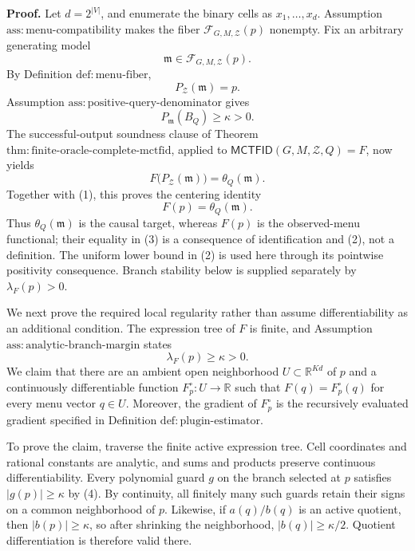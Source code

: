 \textbf{Proof.}
Let \(d=2^{|V|}\), and enumerate the binary cells as \(x_1,\ldots,x_d\).  Assumption \(\mathrm{ass:menu\text{-}compatibility}\) makes the fiber \(\mathcal F_{G,M,\mathcal Z}(p)\) nonempty.  Fix an arbitrary generating model
\[
 \mathfrak m\in\mathcal F_{G,M,\mathcal Z}(p).
\]
By Definition \(\mathrm{def:menu\text{-}fiber}\),
\[
 P_{\mathcal Z}(\mathfrak m)=p. \tag{1}
\]
Assumption \(\mathrm{ass:positive\text{-}query\text{-}denominator}\) gives
\[
 P_{\mathfrak m}(B_Q)\geq\kappa>0. \tag{2}
\]
The successful-output soundness clause of Theorem \(\mathrm{thm:finite\text{-}oracle\text{-}complete\text{-}mctfid}\), applied to \(\mathsf{MCTFID}(G,M,\mathcal Z,Q)=F\), now yields
\[
 F\bigl(P_{\mathcal Z}(\mathfrak m)\bigr)=\theta_Q(\mathfrak m).
\]
Together with (1), this proves the centering identity
\[
 F(p)=\theta_Q(\mathfrak m). \tag{3}
\]
Thus \(\theta_Q(\mathfrak m)\) is the causal target, whereas \(F(p)\) is the observed-menu functional; their equality in (3) is a consequence of identification and (2), not a definition.  The uniform lower bound in (2) is used here through its pointwise positivity consequence.  Branch stability below is supplied separately by \(\lambda_F(p)>0\).

We next prove the required local regularity rather than assume differentiability as an additional condition.  The expression tree of \(F\) is finite, and Assumption \(\mathrm{ass:analytic\text{-}branch\text{-}margin}\) states
\[
 \lambda_F(p)\geq\kappa>0. \tag{4}
\]
We claim that there are an ambient open neighborhood \(U\subset\mathbb R^{Kd}\) of \(p\) and a continuously differentiable function \(F_p^{\circ}:U\to\mathbb R\) such that \(F(q)=F_p^{\circ}(q)\) for every menu vector \(q\in U\).  Moreover, the gradient of \(F_p^{\circ}\) is the recursively evaluated gradient specified in Definition \(\mathrm{def:plugin\text{-}estimator}\).

To prove the claim, traverse the finite active expression tree.  Cell coordinates and rational constants are analytic, and sums and products preserve continuous differentiability.  Every polynomial guard \(g\) on the branch selected at \(p\) satisfies \(|g(p)|\geq\kappa\) by (4).  By continuity, all finitely many such guards retain their signs on a common neighborhood of \(p\).  Likewise, if \(a(q)/b(q)\) is an active quotient, then \(|b(p)|\geq\kappa\), so after shrinking the neighborhood, \(|b(q)|\geq\kappa/2\).  Quotient differentiation is therefore valid there.

